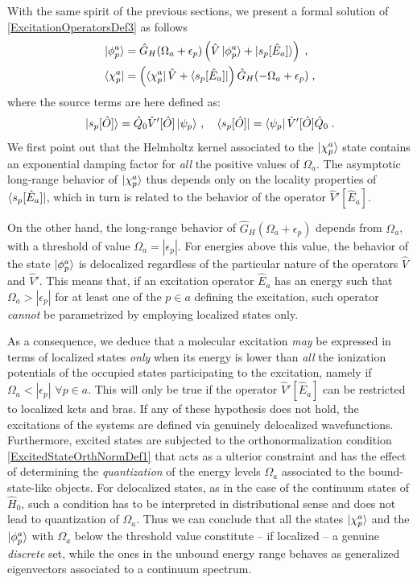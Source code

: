 \documentclass[reprint,aps,prb]{revtex4-1}
\newcommand{\eps}{\epsilon}
\newcommand{\be}{\begin{equation}}
\newcommand{\ee}{\end{equation}}
\newcommand{\nn}{\notag}
\newcommand{\op}[1]{\hat {#1}}
\newcommand{\hnot}{\op{H}_0}
\begin{document}
With the same spirit of the previous sections, we present a formal solution of \eqref{ExcitationOperatorsDef3} as follows 
\begin{align}
\ket{\phi^a_p} &= \op G_H(\Omega_a+\eps_p)\left(\op V \ket{\phi^a_p} + \ket{s_p[\op E_a]} \right) \;, \nn \\
\bra {\chi^a_p} &=\left(\bra{\chi^a_p} \op V  + \bra{s_p[\op E_a]}\right)  \op G_H(-\Omega_a+\eps_p)\;,
\end{align}
where the source terms are here defined as:
\be
 \ket{s_p[\op O]} =  \op Q_0 \op V'[\op O] \ket{\psi_p}\,, \quad
 \bra{s_p[\op O]} =   \bra{\psi_p} \op V'[\op O] \op Q_0 \nn \;.
\ee
We first point out that the Helmholtz kernel associated to the $\ket{\chi^a_p}$ state 
contains an exponential damping factor for \emph{all} the positive values of $\Omega_a$.
The asymptotic long-range behavior of $\ket{\chi^a_p}$ thus depends only on the locality properties of 
$\bra{s_p[\op E_a]}$, which in turn is related to the behavior of the operator $\op V'[\op E_a]$.

On the other hand, the long-range behavior of $\op G_H(\Omega_a+\eps_p)$ depends from 
$\Omega_a$, with a threshold of value $\Omega_a=|\eps_p|$. 
For energies above this value, the behavior of the state $\ket{\phi^a_p}$ is 
delocalized regardless of the particular nature of the operators $\op V$ and $\op V'$.
This means that, if an excitation operator $\op E_a$ has an energy such that
$\Omega_a>|\eps_p|$  for at least one of the $p \in a$ defining the excitation,
such operator \emph{cannot} be parametrized by employing localized states only.

As a consequence, we deduce that a molecular excitation \emph{may} be expressed in terms of localized states
\emph{only} when its energy is lower than \emph{all} the ionization potentials of the occupied states participating to the excitation,
namely if $\Omega_a<|\eps_p|$ $\forall p \in a$. This will only be true if the operator
$\op V'[\op E_a]$ can be restricted to localized kets and bras.
If any of these hypothesis does not hold, the excitations of the systems are defined via genuinely delocalized wavefunctions.
Furthermore, excited states are subjected to the orthonormalization condition 
\eqref{ExcitedStateOrthNormDef1} that acts as a ulterior constraint and has the effect of determining the \emph{quantization}
of the energy levels $\Omega_a$ associated to the bound-state-like objects.
For delocalized states, as in the case of the continuum states of $\hnot$,
such a condition has to be interpreted in distributional sense and does not lead to quantization of $\Omega_a$.
Thus we can conclude that all the states $\ket{\chi^a_p}$ and the $\ket{\phi^a_p}$ with $\Omega_a$ below the threshold value constitute 
-- if localized -- a genuine \emph{discrete} set, while the ones in the unbound energy range behaves as generalized eigenvectors associated to a
continuum spectrum. 
\end{document}
